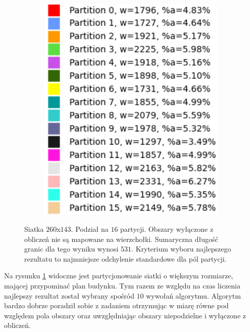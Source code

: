 \begin{figure}[h]
\centering
\begin{subfigure}{\textwidth}
    \centering
    \caption[short]{}
\end{subfigure}
\begin{subfigure}{\textwidth}
    \centering
    \caption[short]{}
\end{subfigure}
\begin{subfigure}{\textwidth}
    \centering
    \includegraphics[width=0.3\linewidth]{images/results/m_k/with/19/results}
    \caption[short]{}
\end{subfigure}
\caption{Siatka $260$x$143$. Podział na $16$ partycji.
Obszary wyłączone z obliczeń nie są mapowane na wierzchołki.
Sumaryczna długość granic dla tego wyniku wynosi $531$.
Kryterium wyboru najlepszego rezultatu to najmniejsze odchylenie standardowe dla pól partycji.}
\label{result:19}
\end{figure}
\FloatBarrier
Na rysunku \ref{result:19} widoczne jest partycjonowanie siatki o większym rozmiarze, mającej
przypominać plan budynku.
Tym razem ze względu na czas liczenia najlepszy rezultat został wybrany spośród $10$ wywołań algorytmu.
Algorytm bardzo dobrze poradził sobie z zadaniem otrzymując w miarę równe pod względem pola obszary oraz uwzględniając
obszary niepodzielne i wyłączone z obliczeń.